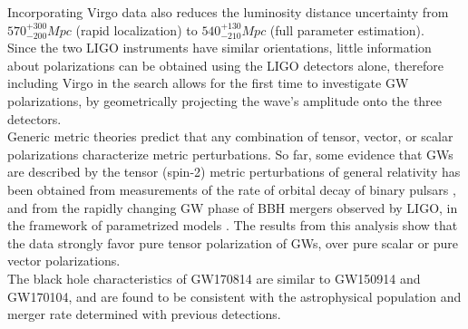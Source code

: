 \documentclass[binding=0.6cm, LaM]{sapthesis}
\begin{document}
	Incorporating Virgo data also reduces the luminosity distance uncertainty from 
	$570^{+300}_{-200}Mpc$ (rapid localization) to $540^{+130}_{-210} Mpc$ (full parameter estimation). \\
	 Since the two LIGO instruments have similar orientations, little information about polarizations 
	can be obtained using the LIGO detectors alone, therefore including Virgo in the search 
	allows for the first time to investigate GW polarizations, by geometrically 
	projecting the wave’s amplitude onto the three detectors. \\
	Generic metric theories predict that any combination of tensor, vector, or scalar 
	polarizations \cite{171,172} characterize metric perturbations.
	So far, some evidence that GWs are described by the tensor (spin-2) metric perturbations 
	of general relativity has been obtained from measurements of the rate of orbital decay of binary pulsars \cite{173,176}, 
	and from the rapidly changing GW phase of BBH mergers observed by LIGO, in the framework of parametrized models \cite{52,57,60}. 
	The results from this analysis show that the data strongly favor
	pure tensor polarization of GWs, over pure scalar or pure vector polarizations. \\
	The black hole characteristics of GW170814 are similar to GW150914 and GW170104, 
	and are found to be consistent with the astrophysical population and merger rate determined with previous detections.
\end{document}

